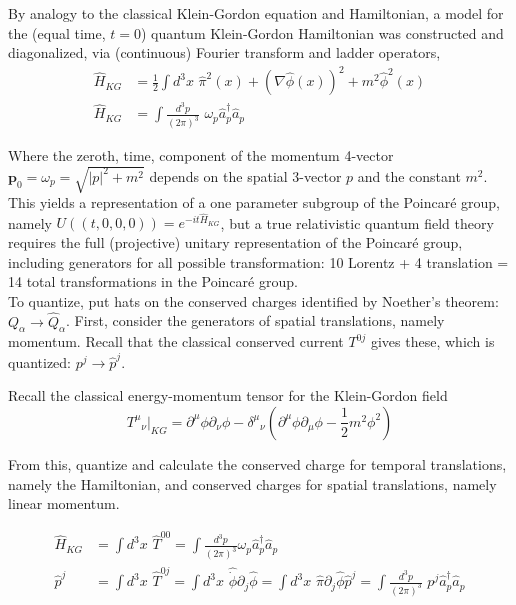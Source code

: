 \noindent By analogy to the classical Klein-Gordon equation and Hamiltonian, a model for the (equal time, $t=0$) quantum Klein-Gordon Hamiltonian was constructed and diagonalized, via (continuous) Fourier transform and ladder operators, 
\begin{align}
\hat{H}_{KG} &= \frac{1}{2} \int d^ 3 x \,\, \hat{\pi}^2(x) + (\nabla \hat{\phi}(x))^2 + m^2 \hat{\phi}^2(x) \\
\hat{H}_{KG} &= \int \frac{d^3 p}{(2\pi)^3} \,\, \omega_p \hat{a}_p^\dagger \hat{a}_p
\end{align}

\noindent Where the zeroth, time, component of the momentum 4-vector $\textbf{p}_0 = \omega_p = \sqrt{|p|^2 + m^2}$ depends on the spatial 3-vector $p$ and the constant $m^2$. \\

\noindent This yields a representation of a one parameter subgroup of the Poincar\'e group, namely $U((t,0,0,0))=e^{-it\hat{H}_{KG}}$, but a true relativistic quantum field theory requires the full (projective) unitary representation of the Poincar\'e group, including generators for all possible transformation: 10 Lorentz + 4 translation = 14 total transformations in the Poincar\'e group. \\

\noindent To quantize, put hats on the conserved charges identified by Noether's theorem: $Q_\alpha \rightarrow \hat{Q}_\alpha$. First, consider the generators of spatial translations, namely momentum. Recall that the classical conserved current $T^{0j}$ gives these, which is quantized: $p^j \rightarrow \hat{p}^j$.

\noindent Recall the classical energy-momentum tensor for the Klein-Gordon field
\begin{equation}
T^\mu_{\,\,\,\, \nu} |_{KG} = \partial^\mu \phi \partial_\nu \phi - \delta^\mu_{\,\,\,\, \nu} (\partial^\mu \phi \partial_\mu \phi - \frac{1}{2} m^2 \phi^2)
\end{equation}

\noindent From this, quantize and calculate the conserved charge for temporal translations, namely the Hamiltonian, and conserved charges for spatial translations, namely linear momentum.

\begin{align}
\hat{H}_{KG} &= \int d^3 x \,\, \hat{T}^{00} = \int \frac{d^3 p}{(2\pi)^3} \omega_p \hat{a}_p^\dagger \hat{a}_p\\
\hat{p}^j &= \int d^3 x \,\, \hat{T}^{0j} = \int d^3 x \,\, \hat{\dot{\phi}} \partial_j \hat{\phi} = \int d^3 x \,\, \hat{\pi} \partial_j \hat{\phi} \hat{p}^j = \int \frac{d^3 p}{(2\pi)^3} \,\, p^j \hat{a}_p^\dagger \hat{a}_p
\end{align}

